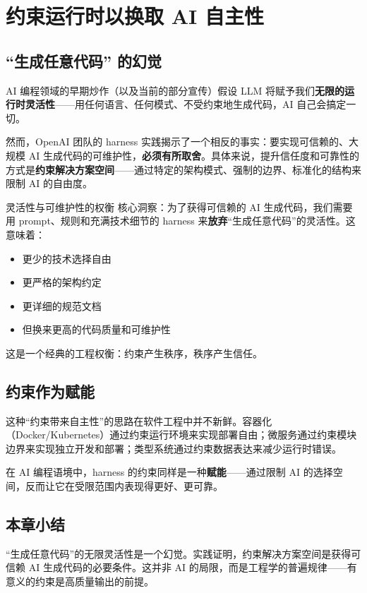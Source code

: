 \section{约束运行时以换取 AI 自主性}

\subsection{``生成任意代码'' 的幻觉}

AI 编程领域的早期炒作（以及当前的部分宣传）假设 LLM 将赋予我们\textbf{无限的运行时灵活性}------用任何语言、任何模式、不受约束地生成代码，AI 自己会搞定一切。

然而，OpenAI 团队的 harness 实践揭示了一个相反的事实：要实现可信赖的、大规模 AI 生成代码的可维护性，\textbf{必须有所取舍}。具体来说，提升信任度和可靠性的方式是\textbf{约束解决方案空间}------通过特定的架构模式、强制的边界、标准化的结构来限制 AI 的自由度。

\begin{importantbox}{灵活性与可维护性的权衡}
核心洞察：为了获得可信赖的 AI 生成代码，我们需要用 prompt、规则和充满技术细节的 harness 来\textbf{放弃}``生成任意代码''的灵活性。这意味着：
\begin{itemize}[leftmargin=1.5em]
    \item 更少的技术选择自由
    \item 更严格的架构约定
    \item 更详细的规范文档
    \item 但换来更高的代码质量和可维护性
\end{itemize}
这是一个经典的工程权衡：约束产生秩序，秩序产生信任。
\end{importantbox}

\subsection{约束作为赋能}

这种``约束带来自主性''的思路在软件工程中并不新鲜。容器化（Docker/Kubernetes）通过约束运行环境来实现部署自由；微服务通过约束模块边界来实现独立开发和部署；类型系统通过约束数据表达来减少运行时错误。

在 AI 编程语境中，harness 的约束同样是一种\textbf{赋能}------通过限制 AI 的选择空间，反而让它在受限范围内表现得更好、更可靠。

\subsection{本章小结}

``生成任意代码''的无限灵活性是一个幻觉。实践证明，约束解决方案空间是获得可信赖 AI 生成代码的必要条件。这并非 AI 的局限，而是工程学的普遍规律------有意义的约束是高质量输出的前提。

\newpage

